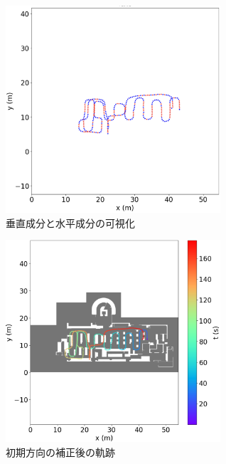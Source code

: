\begin{figure}[ht]
	\centering
	\includegraphics[width=80mm]{image/rb.jpg}
	\caption{垂直成分と水平成分の可視化}    \label{fig:color}
\end{figure}

\begin{figure}[ht]
	\centering
	\includegraphics[width=80mm]{image/pdr-rotate.jpg}
	\caption{初期方向の補正後の軌跡}    \label{fig:pdr-rotate}
\end{figure}
